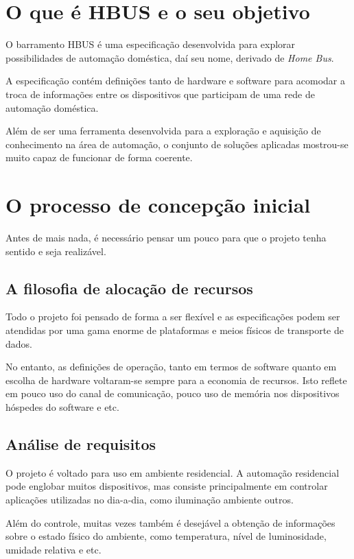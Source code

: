 \documentclass[11pt]{report}
\begin{document}
\section{O que é HBUS e o seu objetivo}

O barramento HBUS é uma especificação desenvolvida para explorar possibilidades de automação doméstica, daí seu nome, derivado de \textit{Home Bus}.

A especificação contém definições tanto de hardware e software para acomodar a troca de informações entre os dispositivos que participam de uma rede de automação doméstica.

Além de ser uma ferramenta desenvolvida para a exploração e aquisição de conhecimento na área de automação, o conjunto de soluções aplicadas mostrou-se muito capaz de funcionar de forma coerente.

\section{O processo de concepção inicial}

Antes de mais nada, é necessário pensar um pouco para que o projeto tenha sentido e seja realizável.

\subsection{A filosofia de alocação de recursos}

Todo o projeto foi pensado de forma a ser flexível e as especificações podem ser atendidas por uma gama enorme de plataformas e meios físicos de transporte de dados.

No entanto, as definições de operação, tanto em termos de software quanto em escolha de hardware voltaram-se sempre para a economia de recursos. Isto reflete em pouco uso do canal de comunicação, pouco uso de memória nos dispositivos hóspedes do software e etc.

\subsection{Análise de requisitos}

O projeto é voltado para uso em ambiente residencial. A automação residencial pode englobar muitos dispositivos, mas  consiste principalmente em controlar aplicações utilizadas no dia-a-dia, como iluminação ambiente outros.

Além do controle, muitas vezes também é desejável a obtenção de informações sobre o estado físico do ambiente, como temperatura, nível de luminosidade, umidade relativa e etc.
\end{document}
